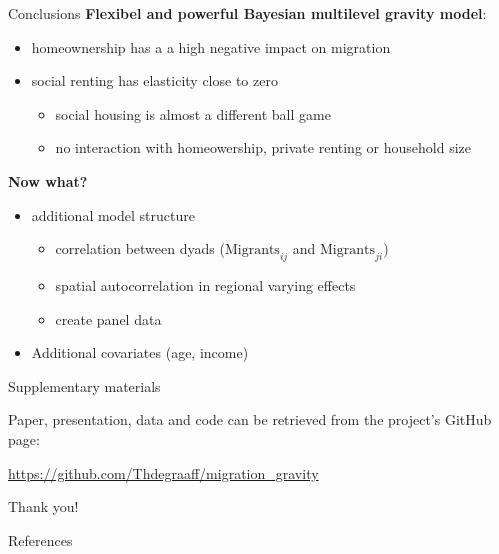 \documentclass{beamer}
\begin{document}
\begin{frame}{Conclusions}
\textbf{Flexibel and powerful Bayesian multilevel gravity model}:
\begin{itemize}
	\item homeownership has a a high negative impact on migration
	\item social renting has elasticity close to \alert{zero} \citep{boyle1998migration}
	\begin{itemize}
		\item social housing is almost \alert{a different ball game}
		\item no interaction with homeowership, private renting or household size
	\end{itemize}
\end{itemize}

\textbf{Now what?}
\begin{itemize}
	\item additional model structure
	\begin{itemize}
		\item correlation between \alert{dyads} ($\text{Migrants}_{ij}$ and $\text{Migrants}_{ji}$)
		\item \alert{spatial} autocorrelation in regional varying effects
		\item create panel data
	\end{itemize}
\item Additional covariates (age, income)
\end{itemize}
\end{frame}

\begin{frame}{Supplementary materials}

Paper, presentation, data and code can be retrieved from the project's GitHub page: 

\begin{center}\url{https://github.com/Thdegraaff/migration\_gravity}\end{center}

\end{frame}

\begin{frame}[standout]
Thank you!
\end{frame}

\appendix

\begin{frame}[allowframebreaks]{References}

		\printbibliography[heading=none]

\end{frame}
\end{document}
